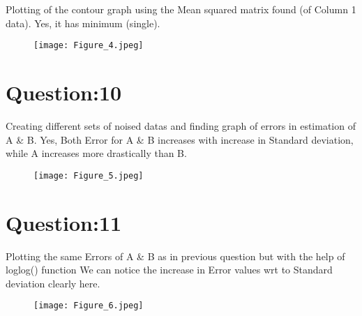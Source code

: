 \documentclass[12pt]{article}
\begin{document}
Plotting of the contour graph using the Mean squared matrix found (of Column 1 data).
\linebreak
Yes, it has minimum (single).

\begin{figure}[h!]
\centering
\texttt{[image: Figure\_4.jpeg]}
\end{figure}

\newpage
\section*{Question:10}

Creating different sets of noised datas and finding graph of errors in estimation of A \& B.\linebreak
\linebreak
Yes, Both Error for A \& B increases with increase in Standard deviation, while A increases more drastically than B.

\begin{figure}[h!]
\centering
\texttt{[image: Figure\_5.jpeg]}
\end{figure}

\newpage
\section*{Question:11}

Plotting the same Errors of A \& B as in previous question but with the help of loglog() function
\linebreak
We can notice the increase in Error values wrt to Standard deviation clearly here.

\begin{figure}[h!]
\centering
\texttt{[image: Figure\_6.jpeg]}
\end{figure}
\end{document}
